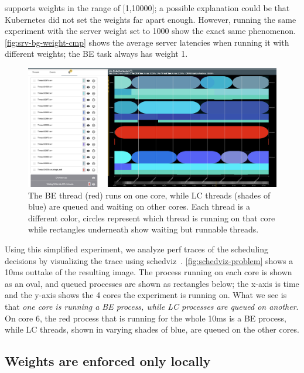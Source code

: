 \cgroups{} supports weights in the range of [1,10000]; a possible explanation
could be that Kubernetes did not set the weights far apart enough. However,
running the same experiment with the server weight set to 1000 show the exact
same phenomenon. \autoref{fig:srv-bg-weight-cmp} shows the average server
latencies when running it with different weights; the BE task always has weight
1.

\begin{figure}[t]
    \centering
    \includegraphics[width=\columnwidth]{graphs/schedviz-problem.png}
    \caption{The BE thread (red) runs on one core, while LC threads (shades of
    blue) are queued and waiting on other cores. Each thread is a different
    color, circles represent which thread is running on that core while
    rectangles underneath show waiting but runnable threads.
    }\label{fig:schedviz-problem}
\end{figure}

Using this simplified experiment, we analyze perf traces of the scheduling
decisions by visualizing the trace using schedviz~\cite{schedviz-tool}.
\autoref{fig:schedviz-problem} shows a 10ms outtake of the resulting image. The
process running on each core is shown as an oval, and queued processes are shown
as rectangles below; the x-axis is time and the y-axis shows the 4 cores the
experiment is running on. What we see is that \textit{one core is running a BE
process, while LC processes are queued on another}. On core 6, the red process
that is running for the whole 10ms is a BE process, while LC threads, shown in
varying shades of blue, are queued on the other cores.

\subsection{Weights are enforced only locally}\label{ss:problem:weights-local}

